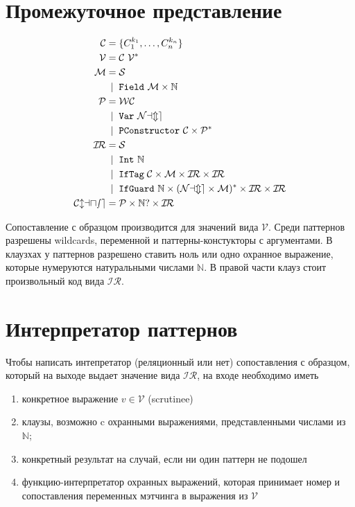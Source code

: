 \documentclass[a5paper,12pt]{article}
\newcommand{\ir}{\ensuremath{\mathcal{I\!R}}}
\begin{document}
\section{Промежуточное представление}
\begin{align*}
\mathcal{C} =&\; \{ C_1^{k_1}, \dots, C_n^{k_n} \} \\
\mathcal{V} =&\;  \mathcal{C}\ \mathcal{V}^*\\
\mathcal{M} =&\;  \mathcal{S} \\
          \mid\; &\; \text{\texttt{Field}}\  \mathcal{M}\times  \mathbb{N}\\
\mathcal{P} =&\;  \mathcal{WC} \\
          \mid\; &\; \text{\texttt{Var}}\  \mathcal{Name}\\
          \mid\; &\; \text{\texttt{PConstructor}}\  \mathcal{C}\times  \mathcal{P}^*\\
\ir  =&\; \mathcal{S} \\
           \mid\; &\;\text{\texttt{Int}}\  \mathbb{N} \\
           \mid\; &\; \text{\texttt{IfTag}}\; \mathcal{C}\times \mathcal{M}\times \ir\times \ir\\
           \mid\; &\; \text{\texttt{IfGuard}}\ \mathbb{N}\times (\mathcal{Name}\times \mathcal{M})^*\times \ir\times \ir\\
\mathcal{Clause} =&\;  \mathcal{P} \times \mathbb{N}? \times \ir \\           
\end{align*}

Сопоставление с образцом производится для значений вида $\mathcal{V}$. Среди паттернов разрешены wildcards, переменной и паттерны-констукторы с аргументами. В клаузхах у паттернов разрешено ставить ноль или одно охранное выражение, которые нумеруются натуральными числами $\mathbb{N}$. В правой части клауз стоит произвольный код вида $\ir$.

\section{Интерпретатор паттернов}
Чтобы написать интепретатор (реляционный или нет) сопоставления с образцом, который на выходе выдает значение вида $\ir$, на входе необходимо иметь
\begin{enumerate}
\item конкретное выражение $v\in \mathcal{V}$ (scrutinee)
\item клаузы, возможно c охранными выражениями, представленными числами из $\mathbb{N}$;
\item конкретный результат на случай, если ни один паттерн не подошел
\item функцию-интерпретатор охранных выражений, которая принимает номер и сопоставления переменных мэтчинга в выражения из $\mathcal{V}$
\end{enumerate}
\end{document}
